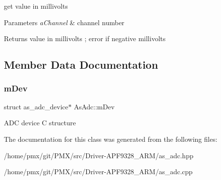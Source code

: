 get value in millivolts 


\begin{DoxyParams}{Parameters}
{\em a\+Channel} & channel number\\
\hline
\end{DoxyParams}
\begin{DoxyReturn}{Returns}
value in millivolts ; error if negative millivolts 
\end{DoxyReturn}


\subsection{Member Data Documentation}
\mbox{\label{classAsAdc_a30bbfa90486f79898d1381efec02165f}} 
\subsubsection{\texorpdfstring{m\+Dev}{mDev}}
{\footnotesize\ttfamily struct as\+\_\+adc\+\_\+device$\ast$ As\+Adc\+::m\+Dev\hspace{0.3cm}{\ttfamily [protected]}}

A\+DC device C structure 

The documentation for this class was generated from the following files\+:\begin{DoxyCompactItemize}
\item 
/home/pmx/git/\+P\+M\+X/src/\+Driver-\/\+A\+P\+F9328\+\_\+\+A\+R\+M/as\+\_\+adc.\+hpp\item 
/home/pmx/git/\+P\+M\+X/src/\+Driver-\/\+A\+P\+F9328\+\_\+\+A\+R\+M/as\+\_\+adc.\+cpp\end{DoxyCompactItemize}
